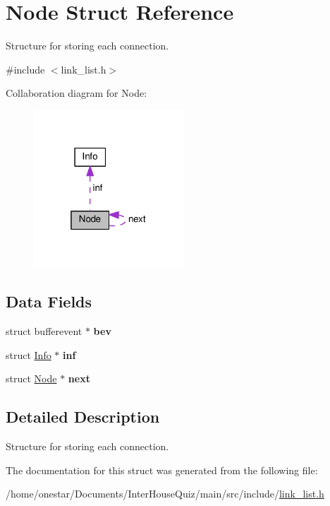 \hypertarget{struct_node}{\section{Node Struct Reference}
\label{struct_node}
}


Structure for storing each connection.  




{\ttfamily \#include $<$link\+\_\+list.\+h$>$}



Collaboration diagram for Node\+:\nopagebreak
\begin{figure}[H]
\begin{center}
\leavevmode
\includegraphics[width=160pt]{struct_node__coll__graph}
\end{center}
\end{figure}
\subsection*{Data Fields}
\begin{DoxyCompactItemize}
\item 
\hypertarget{struct_node_a7a6bf7d3dd8ad7622482a90042e470ef}{struct bufferevent $\ast$ {\bfseries bev}}\label{struct_node_a7a6bf7d3dd8ad7622482a90042e470ef}

\item 
\hypertarget{struct_node_a059d3b39cd7765e831a1a3a5b7195890}{struct \hyperlink{struct_info}{Info} $\ast$ {\bfseries inf}}\label{struct_node_a059d3b39cd7765e831a1a3a5b7195890}

\item 
\hypertarget{struct_node_aa162dd1e0693188a22b1f13b9a2a0ef0}{struct \hyperlink{struct_node}{Node} $\ast$ {\bfseries next}}\label{struct_node_aa162dd1e0693188a22b1f13b9a2a0ef0}

\end{DoxyCompactItemize}


\subsection{Detailed Description}
Structure for storing each connection. 

The documentation for this struct was generated from the following file\+:\begin{DoxyCompactItemize}
\item 
/home/onestar/\+Documents/\+Inter\+House\+Quiz/main/src/include/\hyperlink{link__list_8h}{link\+\_\+list.\+h}\end{DoxyCompactItemize}
